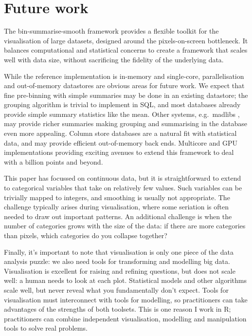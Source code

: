 \documentclass[journal]{vgtc}                %
\begin{document}
\section{Future work}
\label{sec:conclusion}

The bin-summarise-smooth framework provides a flexible toolkit for the visualisation of large datasets, designed around the pixels-on-screen bottleneck. It balances computational and statistical concerns to create a framework that scales well with data size, without sacrificing the fidelity of the underlying data.

While the reference implementation is in-memory and single-core, parallelisation and out-of-memory datastores are obvious areas for future work. We expect that fine pre-binning with simple summaries may be done in an existing datastore; the grouping algorithm is trivial to implement in SQL, and most databases already provide simple summary statistics like the mean. Other systems, e.g.\ madlibs \citep{hellerstein:2012}, may provide richer summaries making grouping and summarising in the database even more appealing. Column store databases \citep{kersten:2011} are a natural fit with statistical data, and may provide efficient out-of-memory back ends. Multicore and GPU implementations providing exciting avenues to extend this framework to deal with a billion points and beyond.

This paper has focussed on continuous data, but it is straightforward to extend to categorical variables that take on relatively few values. Such variables can be trivially mapped to integers, and smoothing is usually not appropriate. The challenge typically arises during visualisation, where some seriation \citep{hahsler:2008} is often needed to draw out important patterns. An additional challenge is when the number of categories grows with the size of the data: if there are more categories than pixels, which categories do you collapse together?

Finally, it's important to note that visualisation is only one piece of the data analysis puzzle: we also need tools for transforming and modelling big data. Visualisation is excellent for raising and refining questions, but does not scale well: a human needs to look at each plot. Statistical models and other algorithms scale well, but never reveal what you fundamentally don't expect. Tools for visualisation must interconnect with tools for modelling, so practitioners can take advantages of the strengths of both toolsets. This is one reason I work in R; practitioners can combine independent visualisation, modelling and manipulation tools to solve real problems.





\end{document}
